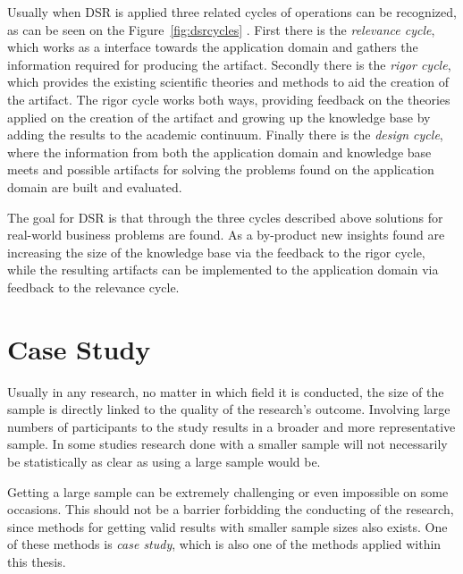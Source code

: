 Usually when DSR is applied three related cycles of operations can be recognized, as can be seen on the Figure~\ref{fig:dsrcycles} \cite{hevner_three_2007}. First there is the \textit{relevance cycle}, which works as a interface towards the application domain and gathers the information required for producing the artifact. Secondly there is the \textit{rigor cycle}, which provides the existing scientific theories and methods to aid the creation of the artifact. The rigor cycle works both ways, providing feedback on the theories applied on the creation of the artifact and growing up the knowledge base by adding the results to the academic continuum. Finally there is the \textit{design cycle}, where the information from both the application domain and knowledge base meets and possible artifacts for solving the problems found on the application domain are built and evaluated. 

The goal for DSR is that through the three cycles described above solutions for real-world business problems are found. As a by-product new insights found are increasing the size of the knowledge base via the feedback to the rigor cycle, while the resulting artifacts can be implemented to the application 	domain via feedback to the relevance cycle. \cite{piirainen_constructive_2013}








\section{Case Study}

Usually in any research, no matter in which field it is conducted, the size of the sample is directly linked to the quality of the research's outcome. Involving large numbers of participants to the study results in a broader and more representative sample. In some studies research done with a smaller sample will not necessarily be statistically as clear as using a large sample would be. \cite[Page 144]{lazar_research_2010}

Getting a large sample can be extremely challenging or even impossible on some occasions. This should not be a barrier forbidding the conducting of the research, since methods for getting valid results with smaller sample sizes also exists. One of these methods is \textit{case study}, which is also one of the methods applied within this thesis. \cite[Page 144]{lazar_research_2010}

